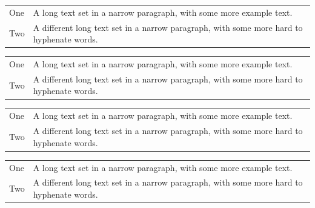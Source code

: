 \documentclass{article}
\begin{document}
	\begin{table}
		\begin{tabular}[t]{l p{3cm}}
			One & A long text set in a narrow paragraph, with some more example text. \\
			Two & A different long text set in a narrow paragraph, with some more  hard to hyphenate words. \\
		\end{tabular}

		\begin{tabular}[t]{l>{\raggedright\arraybackslash} p{3cm}}
			One & A long text set in a narrow paragraph, with some more example text. \\
			Two & A different long text set in a narrow paragraph, with some more  hard to hyphenate words. \\
		\end{tabular}
		
		\begin{tabular}[t]{l>{\RaggedRight} p{3cm}}
			One & A long text set in a narrow paragraph, with some more example text. \\
			Two & A different long text set in a narrow paragraph, with some more  hard to hyphenate words. \\
		\end{tabular}
		
		\footnotesize
		\begin{tabular}[t]{l p{3cm}}
			One & A long text set in a narrow paragraph, with some more example text. \\
			Two & A different long text set in a narrow paragraph, with some more  hard to hyphenate words. \\
		\end{tabular}
	\end{table}
\end{document}

